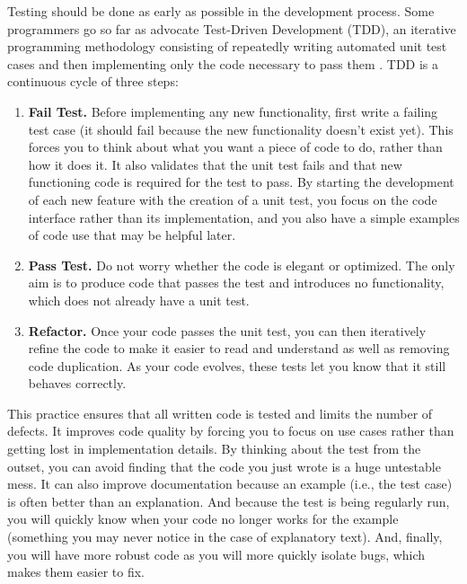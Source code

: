 \documentclass[ChapterTOCs,krantz2]{krantz} %
\begin{document}
Testing should be done as early as possible in the development process.
Some programmers go so far as advocate Test-Driven Development (TDD), an
iterative programming methodology consisting of repeatedly writing automated
unit test cases and then implementing only the code necessary to pass them
\cite{Bec02, Ast03}.  TDD is a continuous cycle of three steps:
\begin{enumerate}

\item {\bf Fail Test.} Before implementing any new functionality, first
write a failing test case (it should fail because the new functionality doesn't
exist yet). This forces you to think about what you want a
piece of code to do, rather than how it does it.  It also validates that the
unit test fails and that new functioning code is required for the test
to pass. By starting the development of each new feature with the creation of a
unit test, you focus on the code interface rather than its implementation, and
you also have a simple examples of code use that may be helpful later.

\item {\bf Pass Test.} Do not worry whether the code is elegant or
optimized. The only aim is to produce code that passes the test and introduces
no functionality, which does not already have a unit test.

\item {\bf Refactor.} Once your code passes the unit test, you can then iteratively
refine the code to make it easier to read and understand as well as removing code
duplication. As your code evolves, these tests let you know that it still
behaves correctly.

\end{enumerate}

This practice ensures that all written code is tested and
limits the number of defects. It improves code quality by forcing you to focus
on use cases rather than getting lost in implementation details. By thinking
about the test from the outset, you can avoid finding that the code you just
wrote is a huge untestable mess. It can also improve documentation because
an example (i.e., the test case) is often better than an explanation. And because
the test is being regularly run, you will quickly know when your code no longer
works for the example (something you may never notice in the case of explanatory
text). And, finally, you will have more robust code as you will more quickly
isolate bugs, which makes them easier to fix.
\end{document}
